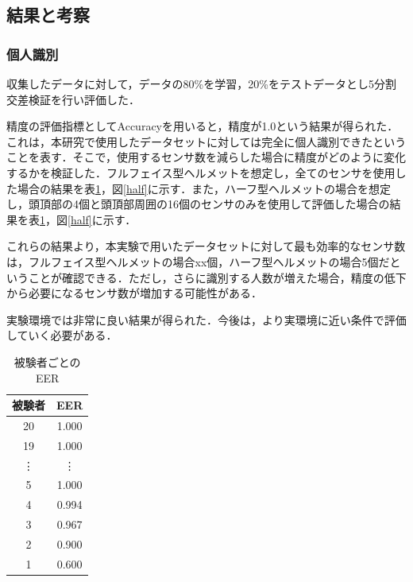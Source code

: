 \documentclass[Japanese,noauthor]{dicomopapers}
\begin{document}
\subsection{結果と考察}
\subsubsection{個人識別}
収集したデータに対して，データの80\%を学習，20\%をテストデータとし5分割交差検証を行い評価した．\par

精度の評価指標としてAccuracyを用いると，精度が1.0という結果が得られた．これは，本研究で使用したデータセットに対しては完全に個人識別できたということを表す．そこで，使用するセンサ数を減らした場合に精度がどのように変化するかを検証した．フルフェイス型ヘルメットを想定し，全てのセンサを使用した場合の結果を表\ref{half_num}，図\ref{half}に示す．また，ハーフ型ヘルメットの場合を想定し，頭頂部の4個と頭頂部周囲の16個のセンサのみを使用して評価した場合の結果を表\ref{half_num}，図\ref{half}に示す．\par

これらの結果より，本実験で用いたデータセットに対して最も効率的なセンサ数は，フルフェイス型ヘルメットの場合xx個，ハーフ型ヘルメットの場合5個だということが確認できる．ただし，さらに識別する人数が増えた場合，精度の低下から必要になるセンサ数が増加する可能性がある．\par

実験環境では非常に良い結果が得られた．今後は，より実環境に近い条件で評価していく必要がある．

\begin{table}[!t]
  \centering
  \caption{被験者ごとのEER}
  \begin{tabular}{c|c} \hline\hline
    被験者 & EER \\ \hline
    20 & 1.000 \\
    19 & 1.000 \\
    \vdots & \vdots \\
    5 & 1.000 \\
    4 & 0.994 \\
    3 & 0.967 \\
    2 & 0.900 \\
    1 & 0.600 \\ \hline
  \end{tabular}
  \label{half_num}
\end{table}
\end{document}
